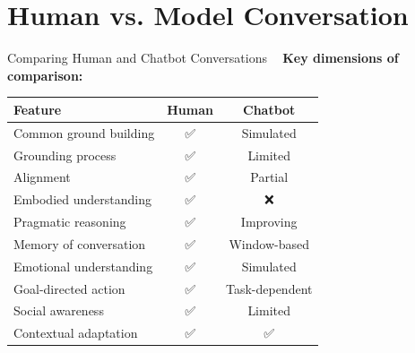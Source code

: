 \documentclass[aspectratio=169]{beamer}
\begin{document}
\section{Human vs. Model Conversation}

\begin{frame}{Comparing Human and Chatbot Conversations 💬🤖}
    \textbf{Key dimensions of comparison:}

    \vspace{0.3cm}

    \begin{table}
        \small
        \begin{tabular}{lcc}
            \toprule
            \textbf{Feature} & \textbf{Human} & \textbf{Chatbot} \\
            \midrule
            Common ground building & ✅ & Simulated \\
            Grounding process & ✅ & Limited \\
            Alignment & ✅ & Partial \\
            Embodied understanding & ✅ & ❌ \\
            Pragmatic reasoning & ✅ & Improving \\
            Memory of conversation & ✅ & Window-based \\
            Emotional understanding & ✅ & Simulated \\
            Goal-directed action & ✅ & Task-dependent \\
            Social awareness & ✅ & Limited \\
            Contextual adaptation & ✅ & ✅ \\
            \bottomrule
        \end{tabular}
    \end{table}
\end{frame}
\end{document}
